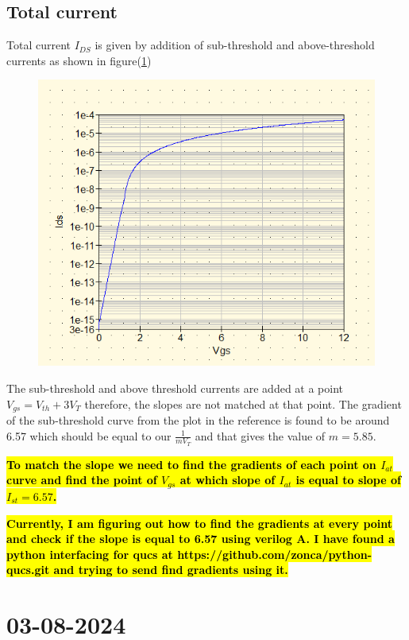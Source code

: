 \documentclass{article}
\begin{document}
\subsection{Total current}
Total current $I_{DS}$ is given by addition of sub-threshold and above-threshold currents as shown in figure(\ref{fig:Itot})
\begin{figure}
    \label{fig:Itot}
    \includegraphics[scale=0.7]{../Images/22072024/Ids-total.png}
\end{figure}

The sub-threshold and above threshold currents are added at a point  $V_{gs} = V_{th}+3V_T$ therefore, the slopes are not matched at that point. The gradient of the sub-threshold curve from the plot in the reference is found to be around 6.57 which should be equal to our $\frac{1}{m V_T}$ and that gives the value of $m = 5.85$. 

\hl{\textbf{To match the slope we need to find the gradients of each point on $I_{at}$ curve and find the point of $V_{gs}$ at which slope of $I_{at}$ is equal to slope of $I_{st} = 6.57$.  }}

\hl{\textbf{Currently, I am figuring out how to find the gradients at every point and check if the slope is equal to 6.57 using verilog A. I have found a python interfacing for qucs at https://github.com/zonca/python-qucs.git and trying to send find gradients using it. }}

\section{03-08-2024}
\end{document}

